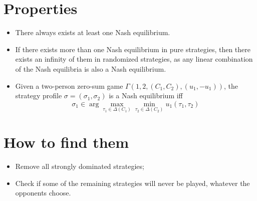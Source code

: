 \documentclass[12pt, openany]{report}
\theoremstyle{definition}
\begin{document}
\section{Properties}
\begin{itemize}
	\item There always exists at least one Nash equilibrium.
	\item If there exists more than one Nash equilibrium in pure strategies, then there exists an infinity of them in randomized strategies, as any linear combination of the Nash equilibria is also a Nash equilibrium.
	\item Given a two-person zero-sum game $\Gamma({1,2},(C_1,C_2), (u_1,-u_1))$, the strategy profile $\sigma=(\sigma_1,\sigma_2)$ is a Nash equilibrium iff 
	\begin{equation}
		\sigma_1\in \arg\max_{\tau_1\in \Delta (C_1)}\min_{\tau_2\in \Delta (C_2)}u_1(\tau_1,\tau_2)
	\end{equation}
\end{itemize}
\section{How to find them}
\begin{itemize}
	\item Remove all strongly dominated strategies;
	\item Check if some of the remaining strategies will never be played, whatever the opponents choose. 
\end{itemize}
\end{document}
